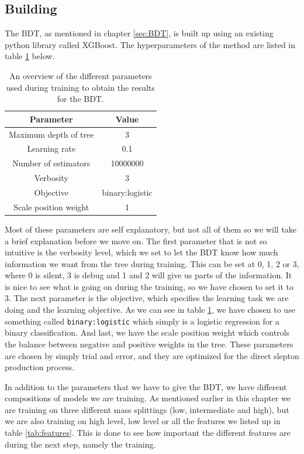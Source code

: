 \subsection{Building}
The BDT, as mentioned in chapter \ref{sec:BDT}, is built up using an existing python library called XGBoost. The hyperparameters of the method are listed in table \ref{tab:parametersBDT} below. 

\begin{table}[H]
    \centering
    \renewcommand{\arraystretch}{1.}
    \begin{tabular}{c c}
    \toprule
    \textbf{Parameter} & \textbf{Value}\\
    \midrule
    \midrule
    Maximum depth of tree & 3\\
    Learning rate     & 0.1 \\
    Number of estimators     & 10000000\\
    Verbosity & 3\\
    Objective & binary:logistic\\
    Scale position weight & 1\\
    \bottomrule
    \end{tabular}
    \caption{An overview of the different parameters used during training to obtain the results for the BDT.}
    \label{tab:parametersBDT}
\end{table}

Most of these parameters are self explanatory, but not all of them so we will take a brief explanation before we move on. The first parameter that is not so intuitive is the verbosity level, which we set to let the BDT know how much information we want from the tree during training. This can be set at 0, 1, 2 or 3, where 0 is silent, 3 is debug and 1 and 2 will give us parts of the information. It is nice to see what is going on during the training, so we have chosen to set it to 3. The next parameter is the objective, which specifies the learning task we are doing and the learning objective. As we can see in table \ref{tab:parametersBDT}, we have chosen to use something called \texttt{binary:logistic} which simply is a logistic regression for a binary classification. And last, we have the scale position weight which controls the balance between negative and positive weights in the tree. These parameters are chosen by simply trial and error, and they are optimized for the direct slepton production process.

In addition to the parameters that we have to give the BDT, we have different compositions of models we are training. As mentioned earlier in this chapter we are training on three different mass splittings (low, intermediate and high), but we are also training on high level, low level or all the features we listed up in table \ref{tab:features}. This is done to see how important the different features are during the next step, namely the training.

